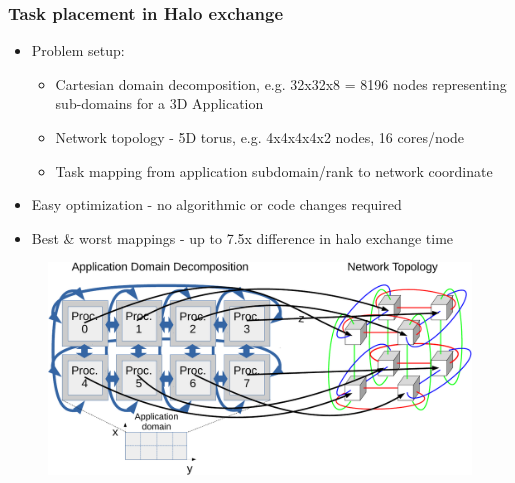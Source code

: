\documentclass{beamer}
\begin{document}
\begin{frame}
\frametitle{Task placement in Halo exchange}
\begin{itemize}
\item Problem setup:
  \begin{itemize}
    \item Cartesian domain decomposition, e.g. 32x32x8 = 8196 nodes representing sub-domains for a 3D Application
    \item Network topology - 5D torus, e.g. 4x4x4x4x2 nodes, 16 cores/node
    \item Task mapping from application subdomain/rank to network coordinate
  \end{itemize}
\item Easy optimization - no algorithmic or code changes required
\item Best \& worst mappings - up to 7.5x difference in halo exchange time
\end{itemize}
\vspace{-0.75em}
\begin{figure}
  \centering
  \includegraphics[width=0.75\linewidth]{../fig/halo-mapping}
\end{figure}
\end{frame}

\end{document}
